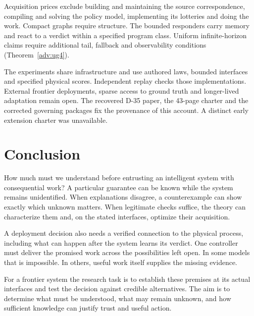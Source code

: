 Acquisition prices exclude building and maintaining the source correspondence, compiling and solving the policy model, implementing its lotteries and doing the work. Compact graphs require structure. The bounded responders carry memory and react to a verdict within a specified program class. Uniform infinite-horizon claims require additional tail, fallback and observability conditions (Theorem~\ref{adv:ug4}).

The experiments share infrastructure and use authored laws, bounded interfaces and specified physical scores. Independent replay checks those implementations. External frontier deployments, sparse access to ground truth and longer-lived adaptation remain open. The recovered D-35 paper, the 43-page charter and the corrected governing packages fix the provenance of this account. A distinct early extension charter was unavailable.

\section{Conclusion}
How much must we understand before entrusting an intelligent system with consequential work? A particular guarantee can be known while the system remains unidentified. When explanations disagree, a counterexample can show exactly which unknown matters. When legitimate checks suffice, the theory can characterize them and, on the stated interfaces, optimize their acquisition.

A deployment decision also needs a verified connection to the physical process, including what can happen after the system learns its verdict. One controller must deliver the promised work across the possibilities left open. In some models that is impossible. In others, useful work itself supplies the missing evidence.

For a frontier system the research task is to establish these premises at its actual interfaces and test the decision against credible alternatives. The aim is to determine what must be understood, what may remain unknown, and how sufficient knowledge can justify trust and useful action.
